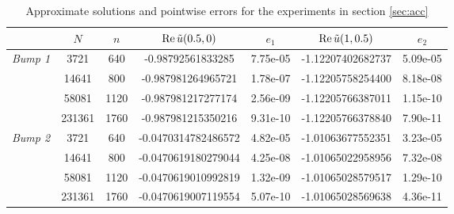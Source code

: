\documentclass[11pt,final]{amsart}
\theoremstyle{definition}
\numberwithin{remark}{section}
\numberwithin{definition}{section}
\numberwithin{pro}{section}
\begin{document}
\begin{table}[ht]
 \begin{tabular}{|c|c|c|c|c|c|c|}
\hline
 & $N$& $n$&$\operatorname{Re} \tilde{u}(0.5,0)$ &$e_1$ &$\operatorname{Re} \tilde{u}(1,0.5)$ &$e_2$ \\ \hline
\multirow{4}{*}{\emph{Bump 1}} &3721&640&-0.98792561833285&7.75e-05&-1.12207402682737&5.09e-05 \\
&14641&800&-0.987981264965721&1.78e-07&-1.12205758254400&8.18e-08 \\
&58081&1120&-0.987981217277174&2.56e-09&-1.12205766387011&1.15e-10\\
&231361&1760&-0.987981215350216&9.31e-10&-1.12205766378840&7.90e-11\\ \hline
\multirow{4}{*}{\emph{Bump 2}} &3721&640&-0.0470314782486572&4.82e-05&-1.01063677552351&3.23e-05\\
&14641&800&-0.0470619180279044&	4.25e-08&-1.01065022958956&7.32e-08\\
&58081&1120&-0.0470619010992819&1.32e-09&-1.01065028579517&1.29e-10\\
&231361&1760& -0.0470619007119554& 5.07e-10&  -1.01065028569638&4.36e-11 \\ \hline
  \end{tabular}
\vspace{2ex}
\caption{\label{tab:bumps} Approximate solutions and pointwise errors for the experiments in section \ref{sec:acc}}
\end{table}
\end{document}
